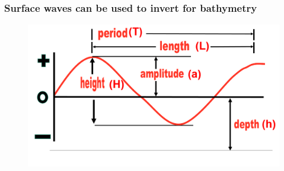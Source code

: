 \documentclass[7pt]{beamer}
\begin{document}
\begin{frame}
\begin{columns}
\begin{figure}
                \end{figure}       
        \end{columns}
\end{frame}


\begin{frame}
    \frametitle{Surface waves can be used to invert for bathymetry}
        \begin{figure}[flowchart]
            \includegraphics[width=1.0\linewidth]{img/Wave.jpg}\hfill
        \end{figure}
\end{frame}
\end{document}
